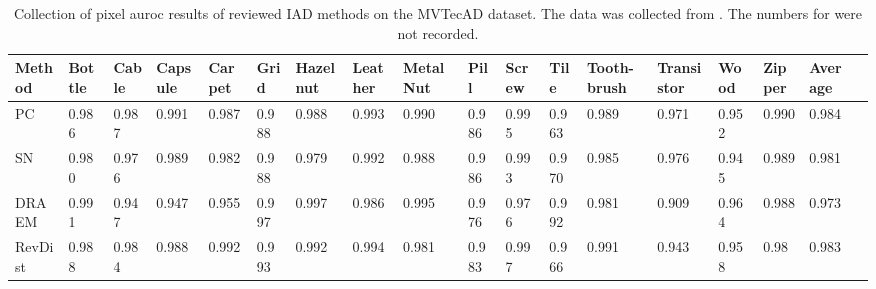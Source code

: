 \begin{table}[htbp]
    \tiny
    \centering
    \begin{tabularx}{\textwidth}{|X|X|X|X|X|X|X|X|X|X|X|X|X|X|X|X|X|X|}%
        \hline
        \textbf{Method} & \textbf{Bottle} & \textbf{Cable} & \textbf{Capsule} & \textbf{Carpet} & \textbf{Grid} & \textbf{Hazelnut} & \textbf{Leather} & \textbf{Metal Nut} & \textbf{Pill} & \textbf{Screw} & \textbf{Tile} & \textbf{Tooth-brush} & \textbf{Transistor} & \textbf{Wood} & \textbf{Zipper} & \textbf{Average} \\
        \hline
        PC \cite{patchCore2022} & 0.986 & 0.987 & 0.991 & 0.987 & 0.988 & 0.988 & 0.993 & 0.990 & 0.986 & 0.995 & 0.963 & 0.989 & 0.971 & 0.952 & 0.990 & 0.984 \\
        \hline
        SN \cite{liu2023simplenet} & 0.980 & 0.976 & 0.989 & 0.982 & 0.988 & 0.979 & 0.992 & 0.988 & 0.986 & 0.993 & 0.970 & 0.985 & 0.976 & 0.945 & 0.989 & 0.981 \\
        \hline
        DRAEM \cite{Zavrtanik_2021DRAEM} & 0.991 & 0.947 & 0.947 & 0.955 & 0.997 & 0.997 & 0.986 & 0.995 & 0.976 & 0.976 & 0.992 & 0.981 & 0.909 & 0.964 & 0.988 & 0.973 \\
        \hline
        RevDist \cite{revdist2023} & 0.988 & 0.984 & 0.988 & 0.992 & 0.993 & 0.992 & 0.994 & 0.981 & 0.983 & 0.997 & 0.966 & 0.991 & 0.943 & 0.958 & 0.98 & 0.983 \\
        \hline
    \end{tabularx}
    \caption{Collection of pixel auroc results of reviewed IAD methods on the MVTecAD \cite{MVTEC_Bergmann_2021} dataset. The data was collected from \cite{liu2024deep} \cite{liu2023simplenet} \cite{Zavrtanik_2021DRAEM} \cite{revdist2023}. The numbers for \cite{csflow2022} were not recorded.}
    \label{tab:pixelaurocmvtec}
\end{table}






